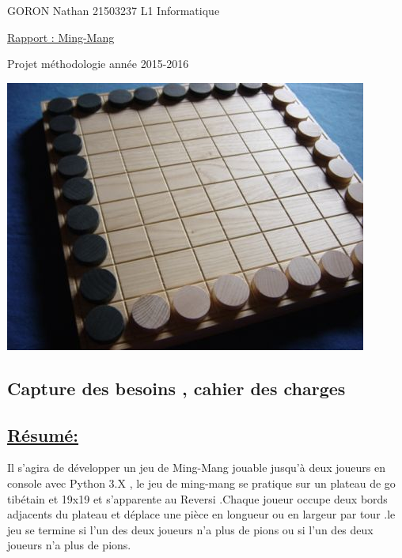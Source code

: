 \documentclass[a4paper,12pt]{article}
\begin{document}
\begin{titlepage}

\begin{flushleft}
GORON Nathan 21503237
\newline
L1 Informatique
\end{flushleft}
\vspace{1cm}
\begin{center}
\begin{huge}
\underline{Rapport : Ming-Mang}
\end{huge}
\end{center}

\begin{center}
\begin{large}
Projet méthodologie année 2015-2016
\vspace{3cm}
\end{large}

\includegraphics[scale=0.5]{images/mingmang.jpg}
\end{center}
\end{titlepage}
\newpage

\tableofcontents







\newpage
\begin{center}
\section{Capture des besoins , cahier des charges}
\vspace{2cm}

\subsection{\underline{Résumé:}}
\vspace{1cm}
Il s'agira de développer un jeu de Ming-Mang jouable jusqu'à deux joueurs en console avec Python 3.X , le jeu de ming-mang se pratique sur un plateau de go tibétain et 19x19 et s'apparente au Reversi .Chaque joueur occupe deux bords adjacents du plateau et déplace une pièce en longueur ou en largeur par tour .le jeu se termine si l'un des deux joueurs n'a plus de pions ou si l'un  des deux joueurs n'a plus de pions.

\end{center}
\end{document}
